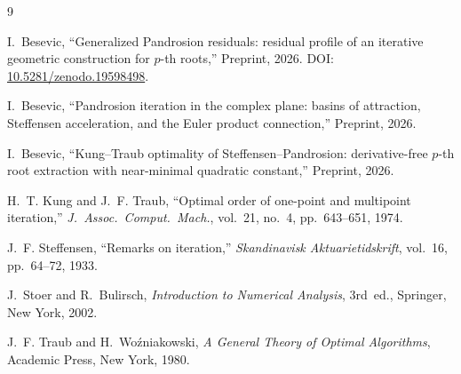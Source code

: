 \documentclass[11pt,a4paper]{article}
\theoremstyle{definition}
\begin{document}
\begin{thebibliography}{9}

I.~Besevic,
``Generalized Pandrosion residuals: residual profile of an iterative geometric construction for $p$-th roots,''
Preprint, 2026.
DOI: \href{https://doi.org/10.5281/zenodo.19598498}{10.5281/zenodo.19598498}.

I.~Besevic,
``Pandrosion iteration in the complex plane: basins of attraction, Steffensen acceleration, and the Euler product connection,''
Preprint, 2026.

I.~Besevic,
``Kung--Traub optimality of Steffensen--Pandrosion: derivative-free $p$-th root extraction with near-minimal quadratic constant,''
Preprint, 2026.

H.~T. Kung and J.~F. Traub,
``Optimal order of one-point and multipoint iteration,''
\textit{J.~Assoc.\ Comput.\ Mach.}, vol.~21, no.~4, pp.~643--651, 1974.

J.~F. Steffensen,
``Remarks on iteration,''
\textit{Skandinavisk Aktuarietidskrift}, vol.~16, pp.~64--72, 1933.

J.~Stoer and R.~Bulirsch,
\textit{Introduction to Numerical Analysis},
3rd~ed., Springer, New York, 2002.

J.~F. Traub and H.~Wo\'{z}niakowski,
\textit{A General Theory of Optimal Algorithms},
Academic Press, New York, 1980.

\end{thebibliography}
\end{document}
